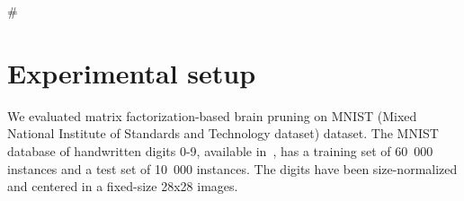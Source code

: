 \documentclass{article} %
\begin{document}
\# 





\section{Experimental setup}

We evaluated matrix factorization-based brain pruning on MNIST (Mixed National
Institute of Standards and Technology dataset) dataset. The MNIST database of
handwritten digits 0-9, available in~\cite{lecun-mnisthandwrittendigit-2010},
has a training set of 60~000 instances and a test set of 10~000 instances. The
digits have been size-normalized and centered in a fixed-size 28x28 images.
\end{document}
